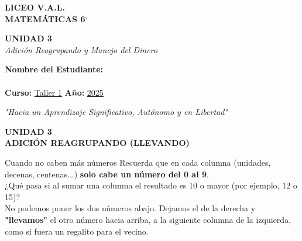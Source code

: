 \documentclass[12pt, letterpaper]{article}
\newcommand{\titulounidad}[2]{
    \begin{tcolorbox}[colback=valblue!10, colframe=valblue, arc=3mm, boxrule=1.5pt]
        \centering \Huge \textbf{UNIDAD #1}\\[0.2cm]
        \Large \textbf{#2}
    \end{tcolorbox}
    \vspace{0.5cm}
}
\begin{document}
\begin{center}
    {\Huge \textbf{LICEO V.A.L.}}\\[0.5cm]
    {\Large \textbf{MATEMÁTICAS 6$^\circ$}}\\[0.5cm]
    \begin{tcolorbox}[colback=valblue!10, colframe=valblue, arc=3mm, boxrule=1.5pt]
        \centering \Huge \textbf{UNIDAD 3}\\[0.2cm]
        \Large \textit{Adición Reagrupando y Manejo del Dinero}
    \end{tcolorbox}
    
    \vspace{0.8cm}
    \begin{tcolorbox}[colback=white, colframe=valblue, width=12cm, arc=3mm, boxrule=1.5pt]
        \centering
        \vspace{0.3cm}
        \textbf{Nombre del Estudiante:}\\[0.3cm]
        \underline{\hspace{9cm}}\\[0.5cm]
        \textbf{Curso:} \underline{Taller 1} \hspace{1cm} \textbf{Año:} \underline{2025}
        \vspace{0.3cm}
    \end{tcolorbox}
    
    \vspace{0.8cm}
    \textit{"Hacia un Aprendizaje Significativo, Autónomo y en Libertad"}
    
 
\end{center}


\titulounidad{3}{ADICIÓN REAGRUPANDO (LLEVANDO)}

\begin{concepto}{Cuando no caben más números}
Recuerda que en cada columna (unidades, decenas, centenas...) \textbf{solo cabe un número del 0 al 9}. 
\\[0.2cm]
¿Qué pasa si al sumar una columna el resultado es 10 o mayor (por ejemplo, 12 o 15)?\\
No podemos poner los dos números abajo. Dejamos el de la derecha y \textbf{"llevamos"} el otro número hacia arriba, a la siguiente columna de la izquierda, como si fuera un regalito para el vecino.
\end{concepto}
\end{document}
